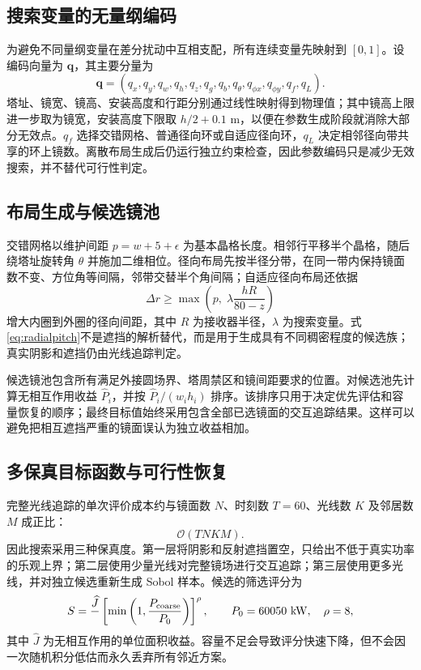 \documentclass[UTF8,a4paper,11pt]{ctexart}
\newcommand{\vect}[1]{\bm{#1}}
\begin{document}
\subsection{搜索变量的无量纲编码}
为避免不同量纲变量在差分扰动中互相支配，所有连续变量先映射到 $[0,1]$。设编码向量为 $\vect q$，其主要分量为
\begin{equation}
\vect q=(q_x,q_y,q_w,q_h,q_z,q_g,q_b,q_\theta,q_{\phi x},q_{\phi y},q_f,q_L).
\end{equation}
塔址、镜宽、镜高、安装高度和行距分别通过线性映射得到物理值；其中镜高上限进一步取为镜宽，安装高度下限取 $h/2+0.1$ m，以便在参数生成阶段就消除大部分无效点。$q_f$ 选择交错网格、普通径向环或自适应径向环，$q_L$ 决定相邻径向带共享的环上镜数。离散布局生成后仍运行独立约束检查，因此参数编码只是减少无效搜索，并不替代可行性判定。

\subsection{布局生成与候选镜池}
交错网格以维护间距 $p=w+5+\epsilon$ 为基本晶格长度。相邻行平移半个晶格，随后绕塔址旋转角 $\theta$ 并施加二维相位。径向布局先按半径分带，在同一带内保持镜面数不变、方位角等间隔，邻带交替半个角间隔；自适应径向布局还依据
\begin{equation}
 \Delta r\ge \max\left(p,\;\lambda\frac{hR}{80-z}\right)
 \label{eq:radialpitch}
\end{equation}
增大内圈到外圈的径向间距，其中 $R$ 为接收器半径，$\lambda$ 为搜索变量。式\eqref{eq:radialpitch}不是遮挡的解析替代，而是用于生成具有不同稠密程度的候选族；真实阴影和遮挡仍由光线追踪判定。

候选镜池包含所有满足外接圆场界、塔周禁区和镜间距要求的位置。对候选池先计算无相互作用收益 $\widehat P_i$，并按 $\widehat P_i/(w_i h_i)$ 排序。该排序只用于决定优先评估和容量恢复的顺序；最终目标值始终采用包含全部已选镜面的交互追踪结果。这样可以避免把相互遮挡严重的镜面误认为独立收益相加。

\subsection{多保真目标函数与可行性恢复}
完整光线追踪的单次评价成本约与镜面数 $N$、时刻数 $T=60$、光线数 $K$ 及邻居数 $M$ 成正比：
\begin{equation}
 \mathcal O(TNK M).
 \label{eq:complexity}
\end{equation}
因此搜索采用三种保真度。第一层将阴影和反射遮挡置空，只给出不低于真实功率的乐观上界；第二层使用少量光线对完整镜场进行交互追踪；第三层使用更多光线，并对独立候选重新生成 Sobol 样本。候选的筛选评分为
\begin{equation}
 S=\frac{\widehat J}{ }\left[\min\left(1,\frac{P_{\rm coarse}}{P_0}\right)\right]^\rho,
 \qquad P_0=60050\ \si{kW},\quad \rho=8,
 \label{eq:screen-score}
\end{equation}
其中 $\widehat J$ 为无相互作用的单位面积收益。容量不足会导致评分快速下降，但不会因一次随机积分低估而永久丢弃所有邻近方案。
\end{document}
